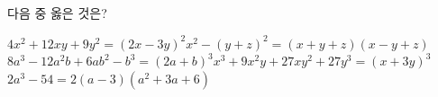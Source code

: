 다음 중 옳은 것은?
\begin{choicesv}{$4x^2+12xy+9y^2=(2x-3y)^2$}{$x^2-(y+z)^2=(x+y+z)(x-y+z)$}{$8a^3-12a^2b+6ab^2-b^3=(2a+b)^3$}{$x^3+9x^2y+27xy^2+27y^3=(x+3y)^3$}{$2a^3-54=2(a-3)(a^2+3a+6)$}\end{choicesv}
